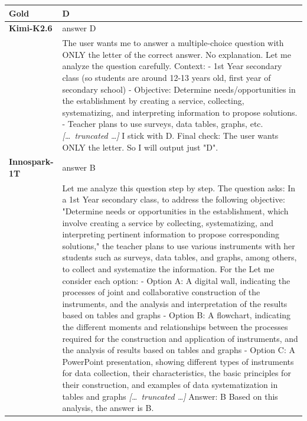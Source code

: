 \begin{longtable}{@{}l p{12.5cm}@{}}
  \textbf{Gold} & D \\
  \midrule
  \textbf{Kimi-K2.6} & answer D \\
  & The user wants me to answer a multiple-choice question with ONLY the letter of the correct answer. No explanation. \newline Let me analyze the question carefully. \newline Context: \newline - 1st Year secondary class (so students are around 12-13 years old, first year of secondary school) \newline - Objective: Determine needs/opportunities in the establishment by creating a service, collecting, systematizing, and interpreting information to propose solutions. \newline - Teacher plans to use surveys, data tables, graphs, etc. \newline \textit{[\ldots\ truncated \ldots]} \newline I stick with D. \newline Final check: The user wants ONLY the letter. So I will output just "D". \\
  \textbf{Innospark-1T} & answer B \\
  & Let me analyze this question step by step. \newline The question asks: In a 1st Year secondary class, to address the following objective: "Determine needs or opportunities in the establishment, which involve creating a service by collecting, systematizing, and interpreting pertinent information to propose corresponding solutions," the teacher plans to use various instruments with her students such as surveys, data tables, and graphs, among others, to collect and systematize the information. For the \newline Let me consider each option: \newline - Option A: A digital wall, indicating the processes of joint and collaborative construction of the instruments, and the analysis and interpretation of the results based on tables and graphs \newline - Option B: A flowchart, indicating the different moments and relationships between the processes required for the construction and application of instruments, and the analysis of results based on tables and graphs \newline - Option C: A PowerPoint presentation, showing different types of instruments for data collection, their characteristics, the basic principles for their construction, and examples of data systematization in tables and graphs \newline \textit{[\ldots\ truncated \ldots]} \newline Answer: B \newline Based on this analysis, the answer is B. \\

\end{longtable}
